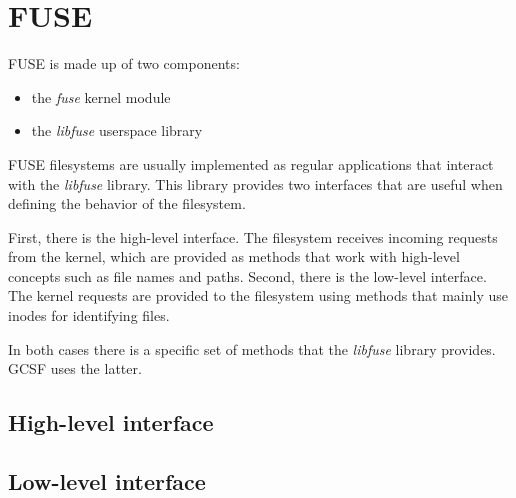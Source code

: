 \section{FUSE}

FUSE is made up of two components:
\begin{itemize}
  \item the \textit{fuse} kernel module
  \item the \textit{libfuse} userspace library
\end{itemize}

FUSE filesystems are usually implemented as regular applications that interact with the \textit{libfuse} library. This library provides two interfaces that are useful when defining the behavior of the filesystem.

First, there is the high-level interface. The filesystem receives incoming requests from the kernel, which are provided as methods that work with high-level concepts such as file names and paths. Second, there is the low-level interface. The kernel requests are provided to the filesystem using methods that mainly use inodes for identifying files.

In both cases there is a specific set of methods that the \textit{libfuse} library provides. GCSF uses the latter.

\subsection{High-level interface}



\subsection{Low-level interface}


